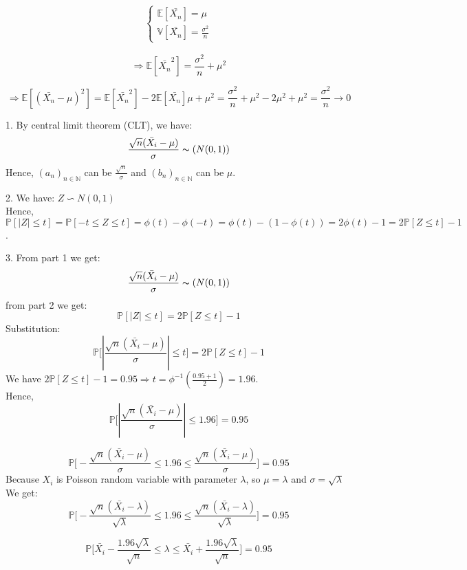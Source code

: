 \documentclass[10pt]{article}
\newenvironment{problem}[2][Problem]{\begin{trivlist}
\item[\hskip \labelsep {\bfseries #1}\hskip \labelsep {\bfseries #2.}]}{\end{trivlist}}
\begin{document}
\begin{problem}{3}

\begin{align}
    \begin{cases}
        \mathbb{E}[\bar{X_n}] = \mu\\
        \mathbb{V}[\bar{X_n}] = \frac{\sigma^2}{n}
    \end{cases}
\end{align}

\[\Rightarrow \mathbb{E}[\bar{X_n}^2] = \frac{\sigma^2}{n} +\mu^2 \]

\[\Rightarrow \mathbb{E}[(\bar{X_n}-\mu)^2]= \mathbb{E}[\bar{X_n}^2]-2\mathbb{E}[\bar{X_n}]\mu+ \mu^2= \frac{\sigma^2}{n}+ \mu^2-2\mu^2+\mu^2=\frac{\sigma^2}{n} \rightarrow 0\]
\item 1.
By central limit theorem (CLT), we have: 
\[ \frac{\sqrt{n}(\bar{X_i}-\mu)}{\sigma} \thicksim \text( N(0,1))\]
Hence, $(a_{n})_{n \in \mathbb{N}}$ can be $\frac{\sqrt{n}}{\sigma}$ and $(b_{n})_{n \in \mathbb{N}}$ can be $\mu$.

\item 2.
We have: $Z \backsim N(0,1)$\\
Hence, $\mathbb{P}[|Z| \leqslant t]=\mathbb{P}[-t\leqslant Z \leqslant t]= \phi(t)-\phi(-t)= \phi(t)-(1-\phi(t))=2\phi(t)-1= 2\mathbb{P}[Z \leqslant t]-1$.
\item 3.
From part 1 we get: 
\[ \frac{\sqrt{n}(\bar{X_i}-\mu)}{\sigma} \thicksim \text( N(0,1))\]
from part 2 we get:
\[ \mathbb{P}[|Z| \leqslant t]=2\mathbb{P}[Z \leqslant t]-1\]
Substitution:
\[ \mathbb{P}\Big[|\frac{\sqrt{n}(\bar{X_i}-\mu)}{\sigma}| \leqslant t\Big]=2\mathbb{P}[Z \leqslant t]-1\]
We have $2\mathbb{P}[Z \leqslant t]-1=0.95 \Rightarrow t=\phi^{-1}(\frac{0.95+1}{2})=1.96$. \\
Hence, 
\[ \mathbb{P}\Big[|\frac{\sqrt{n}(\bar{X_i}-\mu)}{\sigma}| \leqslant 1.96\Big]= 0.95\]

\[  \mathbb{P}\Big[-\frac{\sqrt{n}(\bar{X_i}-\mu)}{\sigma} \leqslant 1.96 \leqslant \frac{\sqrt{n}(\bar{X_i}-\mu)}{\sigma}\Big]= 0.95\]
Because $X_i$ is Poisson random variable with parameter $\lambda$, so $ \mu=\lambda$ and $\sigma= \sqrt{\lambda}$\\
We get:
\[  \mathbb{P}\Big[-\frac{\sqrt{n}(\bar{X_i}-\lambda)}{\sqrt{\lambda}} \leqslant 1.96 \leqslant \frac{\sqrt{n}(\bar{X_i}-\lambda)}{\sqrt{\lambda}}\Big]= 0.95\]

\[ \mathbb{P}\Big[\bar{X_i}- \frac{1.96\sqrt{\lambda}}{\sqrt{n}} \leqslant \lambda \leqslant \bar{X_i}+ \frac{1.96\sqrt{\lambda}}{\sqrt{n}}  \Big] =0.95\]


\end{problem}
\end{document}
